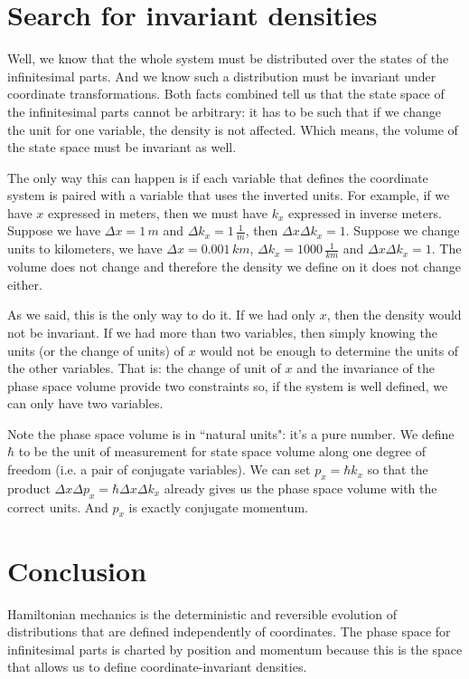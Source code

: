 \documentclass[aps,pra,10pt,floatfix,nofootinbib]{revtex4-1}
\theoremstyle{definition}
\begin{document}
\section{Search for invariant densities}

Well, we know that the whole system must be distributed over the states of the infinitesimal parts. And we know such a distribution must be invariant under coordinate transformations. Both facts combined tell us that the state space of the infinitesimal parts cannot be arbitrary: it has to be such that if we change the unit for one variable, the density is not affected. Which means, the volume of the state space must be invariant as well.

The only way this can happen is if each variable that defines the coordinate system is paired with a variable that uses the inverted units. For example, if we have $x$ expressed in meters, then we must have $k_x$ expressed in inverse meters. Suppose we have $\Delta x = 1 \, m$ and $\Delta k_x = 1 \, \frac{1}{m}$, then $\Delta x \Delta k_x = 1$. Suppose we change units to kilometers, we have $\Delta x = 0.001 \, km$, $\Delta k_x = 1000 \, \frac{1}{km}$ and $\Delta x \Delta k_x = 1$. The volume does not change and therefore the density we define on it does not change either.

As we said, this is the only way to do it. If we had only $x$, then the density would not be invariant. If we had more than two variables, then simply knowing the units (or the change of units) of $x$ would not be enough to determine the units of the other variables. That is: the change of unit of $x$ and the invariance of the phase space volume provide two constraints so, if the system is well defined, we can only have two variables.

Note the phase space volume is in ``natural units": it's a pure number. We define $\hbar$ to be the unit of measurement for state space volume along one degree of freedom (i.e. a pair of conjugate variables). We can set $p_x = \hbar k_x$ so that the product $\Delta x \Delta p_x = \hbar \Delta x \Delta k_x$ already gives us the phase space volume with the correct units. And $p_x$ is exactly conjugate momentum.

\section{Conclusion}

Hamiltonian mechanics is the deterministic and reversible evolution of distributions that are defined independently of coordinates. The phase space for infinitesimal parts is charted by position and momentum because this is the space that allows us to define coordinate-invariant densities.
\end{document}
